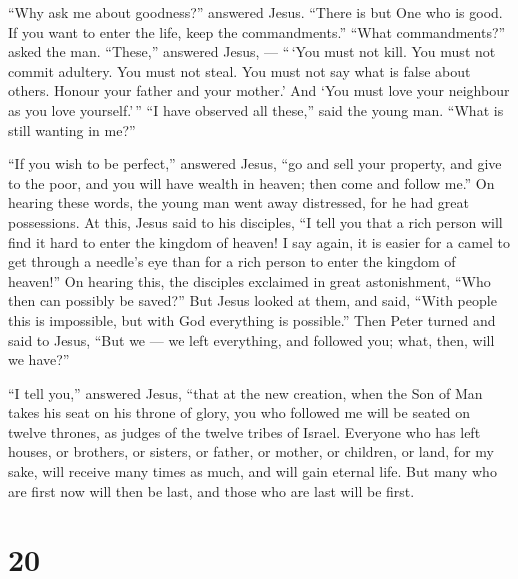  ``Why ask me about goodness?'' answered Jesus. ``There is
but One who is good. If you want to enter the life, keep the
commandments.''  ``What commandments?'' asked the man.
``These,'' answered Jesus, --- ``\,`You must not kill. You must not
commit adultery. You must not steal. You must not say what is false
about others.  Honour your father and your mother.' And
`You must love your neighbour as you love yourself.'\,'' 
``I have observed all these,'' said the young man. ``What is still
wanting in me?''

 ``If you wish to be perfect,'' answered Jesus, ``go and
sell your property, and give to the poor, and you will have wealth in
heaven; then come and follow me.''  On hearing these words,
the young man went away distressed, for he had great possessions.
 At this, Jesus said to his disciples, ``I tell you that a
rich person will find it hard to enter the kingdom of heaven!
 I say again, it is easier for a camel to get through a
needle's eye than for a rich person to enter the kingdom of heaven!''
 On hearing this, the disciples exclaimed in great
astonishment, ``Who then can possibly be saved?''  But
Jesus looked at them, and said, ``With people this is impossible, but
with God everything is possible.'' Then Peter turned and said to Jesus,
 ``But we --- we left everything, and followed you; what,
then, will we have?''

 ``I tell you,'' answered Jesus, ``that at the new
creation, when the Son of Man takes his seat on his throne of glory, you
who followed me will be seated on twelve thrones, as judges of the
twelve tribes of Israel.  Everyone who has left houses, or
brothers, or sisters, or father, or mother, or children, or land, for my
sake, will receive many times as much, and will gain eternal life.
 But many who are first now will then be last, and those
who are last will be first.

\hypertarget{section-19}{%
\section{20}\label{section-19}}


